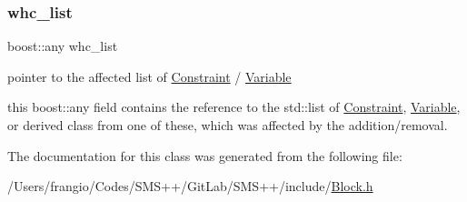 \subsubsection{\texorpdfstring{whc\+\_\+list}{whc\_list}}
{\footnotesize\ttfamily boost\+::any whc\+\_\+list}



pointer to the affected list of \mbox{\hyperlink{class_s_m_spp__di__unipi__it_1_1_constraint}{Constraint}} / \mbox{\hyperlink{class_s_m_spp__di__unipi__it_1_1_variable}{Variable}} 

this boost\+::any field contains the reference to the std\+::list of \mbox{\hyperlink{class_s_m_spp__di__unipi__it_1_1_constraint}{Constraint}}, \mbox{\hyperlink{class_s_m_spp__di__unipi__it_1_1_variable}{Variable}}, or derived class from one of these, which was affected by the addition/removal. 

The documentation for this class was generated from the following file\+:\begin{DoxyCompactItemize}
\item 
/\+Users/frangio/\+Codes/\+S\+M\+S++/\+Git\+Lab/\+S\+M\+S++/include/\mbox{\hyperlink{_block_8h}{Block.\+h}}\end{DoxyCompactItemize}
